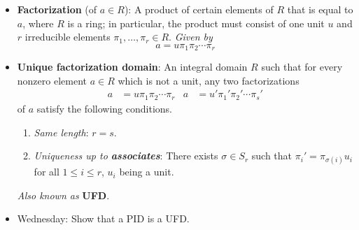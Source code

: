 \documentclass[../notes.tex]{subfiles}
\begin{document}
\begin{itemize}
    \item \textbf{Factorization} (of $a\in R$): A product of certain elements of $R$ that is equal to $a$, where $R$ is a ring; in particular, the product must consist of one unit $u$ and $r$ irreducible elements $\pi_1,\dots,\pi_r\in R$. \emph{Given by}
    \begin{equation*}
        a = u\pi_1\pi_2\cdots\pi_r
    \end{equation*}
    \item \textbf{Unique factorization domain}: An integral domain $R$ such that for every nonzero element $a\in R$ which is not a unit, any two factorizations
    \begin{align*}
        a &= u\pi_1\pi_2\cdots\pi_r&
        a &= u'\pi_1'\pi_2'\cdots\pi_s'
    \end{align*}
    of $a$ satisfy the following conditions.
    \begin{enumerate}[label={(\roman*)}]
        \item \emph{Same length}: $r=s$.
        \item \emph{Uniqueness up to \textbf{associates}}: There exists $\sigma\in S_r$ such that $\pi_i'=\pi_{\sigma(i)}u_i$ for all $1\leq i\leq r$, $u_i$ being a unit.
    \end{enumerate}
    \emph{Also known as} \textbf{UFD}.
    \item Wednesday: Show that a PID is a UFD.
\end{itemize}
\end{document}
